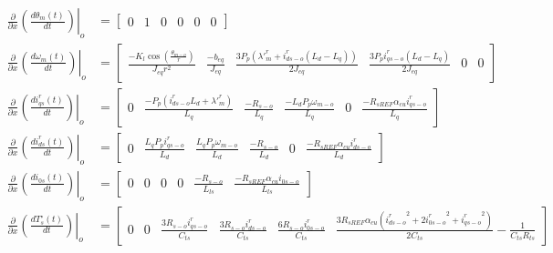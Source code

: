 \documentclass[a4paper, 10pt, onecolumn,journal]{ieeeconf}
\begin{document}
\begin{equation}
    \begin{aligned}
        \left.\frac{\partial}{\partial x}\left( \frac{d \theta_m(t)}{dt}\right) \right|_{o} &= \begin{bmatrix} 0 & 1 & 0 & 0 & 0 & 0 \end{bmatrix}\\
        \left.\frac{\partial}{\partial x}\left( \frac{d \omega_m(t)}{dt}\right) \right|_{o}&= \begin{bmatrix}
        \frac{-K_{l} \cos\left(\frac{\theta_{m-o}}{r}\right)}{J_{eq} r^2}& \frac{-b_{eq}}{J_{eq}} & \frac{3 P_p \left(\lambda'^r_m + i^r_{ds-o} \left(L_d-L_q\right)\right)}{2 J_{eq}} & \frac{3 P_p i^r_{qs-o} \left(L_d-L_q\right)}{2 J_{eq}} & 0 & 0 
        \end{bmatrix}\\
        \left.\frac{\partial}{\partial x}\left( \frac{d i^r_{qs}(t)}{dt}\right) \right|_{o}&= \begin{bmatrix} 
        0 & \frac{-P_p \left(i^r_{ds-o} L_d+\lambda'^r_m\right)}{L_q} & \frac{-R_{s-o}}{L_q} & \frac{-L_d P_p \omega_{m-o}}{L_q} & 0 & \frac{-R_{sREF} \alpha_{cu} i^r_{qs-o}}{L_q} 
        \end{bmatrix}\\
        \left.\frac{\partial}{\partial x}\left( \frac{d i^r_{ds}(t)}{dt}\right) \right|_{o}&= \begin{bmatrix} 
        0 & \frac{L_q P_p i^r_{qs-o}}{L_d} & \frac{L_q P_p \omega_{m-o}}{L_d} & \frac{-R_{s-o}}{L_d} & 0 & \frac{-R_{sREF} \alpha_{cu} i^r_{ds-o}}{L_d} 
        \end{bmatrix}\\
        \left.\frac{\partial}{\partial x}\left( \frac{d i_{0s}(t)}{dt}\right) \right|_{o}&= \begin{bmatrix} 
        0 & 0 & 0 & 0 & \frac{-R_{s-o}}{L_{ls}} & \frac{-R_{sREF} \alpha_{cu} i_{0s-o}}{L_{ls}} 
        \end{bmatrix}\\
        \left.\frac{\partial}{\partial x}\left( \frac{d T^\circ_{s}(t)}{dt}\right)\right|_{o} &= \begin{bmatrix} 
        0 & 0 & \frac{3 R_{s-o} i^r_{qs-o}}{C_{ts}} & \frac{3 R_{s-o} i^r_{ds-o}}{C_{ts}} & \frac{6 R_{s-o} i^r_{0s-o}}{C_{ts}} & \frac{3 R_{sREF} \alpha_{cu} \left({i^r_{ds-o}}^2+2 {i^r_{0s-o}}^2+{i^r_{qs-o}}^2\right)}{2 C_{ts}} - \frac{1}{C_{ts} R_{ts}} 
        \end{bmatrix}\\
    \end{aligned}
    \label{gradientesA}
\end{equation}
\end{document}
